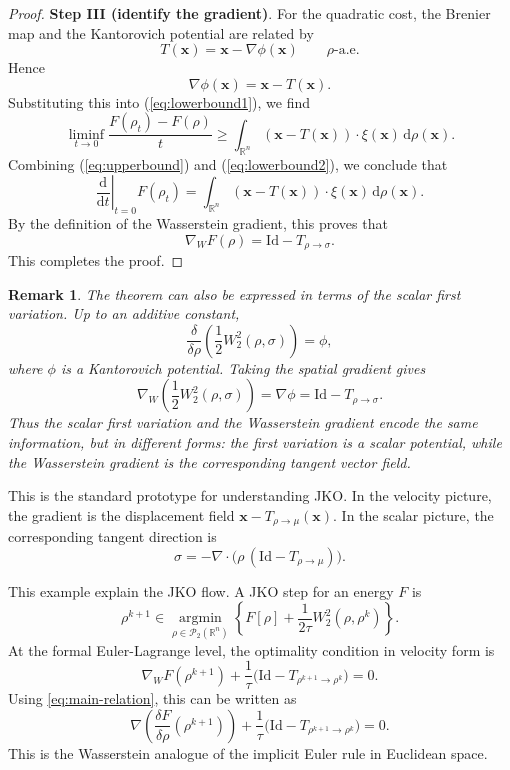 \documentclass[11pt]{book}
\newtheorem{remark}[theorem]{Remark}
\newcommand{\reff}[1]{{\rm (\ref{#1})}}
\newcommand{\R}{\mathbb{R}}
\newcommand{\bx}{\mathbf x}
\newcommand{\Ptwo}{\mathcal{P}_2(\mathbb{R}^n)}
\newcommand{\id}{\mathrm{Id}}
\newcommand{\dd}{\mathrm{d}}
\newcommand{\W}{W_2}
\newcommand{\gradw}{\nabla_{\!W}}
\newcommand{\deldrho}[1]{\frac{\delta #1}{\delta\rho}}
\begin{document}
\begin{proof}
\medskip
\noindent
{\bf Step III (identify the gradient)}.
For the quadratic cost, the Brenier map and the Kantorovich potential are related by
\[
T(\bx)=\bx-\nabla\phi(\bx)
\qquad \rho\text{-a.e.}
\]
Hence
\[
\nabla\phi(\bx)=\bx-T(\bx).
\]
Substituting this into \reff{eq:lowerbound1}, we find
\begin{equation}\label{eq:lowerbound2}
\liminf_{t\to 0}
\frac{F(\rho_t)-F(\rho)}{t}
\ge
\int_{\R^n} (\bx-T(\bx))\cdot \xi(\bx)\,\dd\rho(\bx).
\end{equation}
Combining \reff{eq:upperbound} and \reff{eq:lowerbound2}, we conclude that
\[
\left.\frac{\dd}{\dd t}\right|_{t=0}F(\rho_t)
=
\int_{\R^n} (\bx-T(\bx))\cdot \xi(\bx)\,\dd\rho(\bx).
\]
By the definition of the Wasserstein gradient, this proves that
\[
\gradw F(\rho)=\id-T_{\rho\to\sigma}.
\]
This completes the proof.
\end{proof}

\begin{remark}
The theorem can also be expressed in terms of the scalar first variation. Up to an additive constant,
\[
\frac{\delta}{\delta\rho}\left(\frac12 W_2^2(\rho,\sigma)\right)=\phi,
\]
where $\phi$ is a Kantorovich potential. Taking the spatial gradient gives
\[
\gradw\left(\frac12 W_2^2(\rho,\sigma)\right)=\nabla\phi=\id-T_{\rho\to\sigma}.
\]
Thus the scalar first variation and the Wasserstein gradient encode the same information, but in different forms: the first variation is a scalar potential, while the Wasserstein gradient is the corresponding tangent vector field.
\end{remark}


This is the standard prototype for understanding JKO. In the velocity picture, the gradient is the displacement field $\bx - T_{\rho\to\mu}(\bx)$. In the scalar picture, the corresponding tangent direction is
\[
\sigma = -\nabla\cdot\bigl(\rho\, (\id-T_{\rho\to\mu})\bigr).
\]


This example explain the JKO flow. A JKO step for an energy $F$ is
\begin{equation}
\rho^{k+1}\in \operatorname*{argmin}_{\rho\in\Ptwo}
\left\{F[\rho] + \frac{1}{2\tau}\W^2(\rho,\rho^k)\right\}.
\label{eq:JKO}
\end{equation}
At the formal Euler-Lagrange level, the optimality condition in velocity form is
\begin{equation}
\gradw F(\rho^{k+1}) + \frac{1}{\tau}\bigl(\id - T_{\rho^{k+1}\to \rho^k}\bigr)=0.
\label{eq:JKO-EL}
\end{equation}
Using \eqref{eq:main-relation}, this can be written as
\[
\nabla\!\left(\deldrho{F}(\rho^{k+1})\right)
+ \frac{1}{\tau}\bigl(\id - T_{\rho^{k+1}\to \rho^k}\bigr)=0.
\]
This is the Wasserstein analogue of the implicit Euler rule in Euclidean space.
\end{document}

